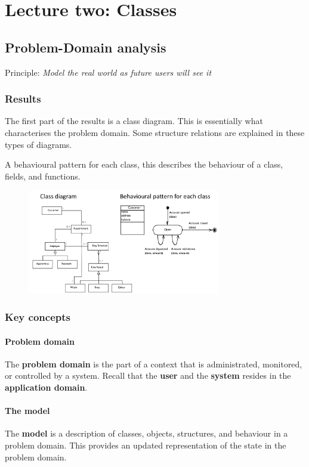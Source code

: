\chapter{Lecture two: Classes}
\section{Problem-Domain analysis}
\begin{center}
    Principle: \textit{Model the real world as future users will see it}
\end{center}
\subsection{Results}
The first part of the results is a class diagram. This is essentially what characterises the problem domain. Some structure relations are explained in these types of diagrams.

A behavioural pattern for each class, this describes the behaviour of a class, fields, and functions.

\begin{figure}[H]
    \centering
    \includegraphics[width=0.75\textwidth]{figures/classdiagandbehaviouralpattern.png}
\end{figure}
\subsection{Key concepts}

\subsubsection{Problem domain}
The \textbf{problem domain} is the part of a context that is administrated, monitored, or controlled by a system. Recall that the \textbf{user} and the \textbf{system} resides in the \textbf{application domain}.

\subsubsection{The model}
The \textbf{model} is a description of classes, objects, structures, and behaviour in a problem domain. This provides an updated representation of the state in the problem domain.

